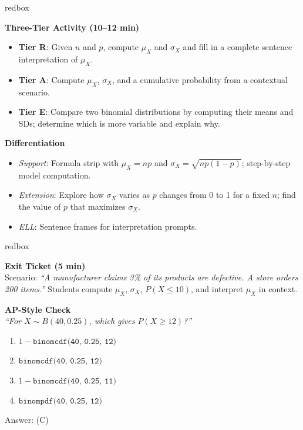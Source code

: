 \documentclass[10pt]{article}
\begin{document}
\begin{skillbox}{redbox}
\begin{minipage}[t]{0.48\linewidth}
    \textbf{Three-Tier Activity (10--12 min)}
    \begin{itemize}
        \item \textbf{Tier R}: Given $n$ and $p$, compute $\mu_X$ and $\sigma_X$
              and fill in a complete sentence interpretation of $\mu_X$.
        \item \textbf{Tier A}: Compute $\mu_X$, $\sigma_X$, and a cumulative
              probability from a contextual scenario.
        \item \textbf{Tier E}: Compare two binomial distributions by computing
              their means and SDs; determine which is more variable and explain why.
    \end{itemize}
\end{minipage}
\hfill
\begin{minipage}[t]{0.48\linewidth}
    \textbf{Differentiation}
    \begin{itemize}
        \item \textit{Support}: Formula strip with $\mu_X = np$ and
              $\sigma_X = \sqrt{np(1-p)}$; step-by-step model computation.
        \item \textit{Extension}: Explore how $\sigma_X$ varies as $p$ changes
              from 0 to 1 for a fixed $n$; find the value of $p$ that maximizes
              $\sigma_X$.
        \item \textit{ELL}: Sentence frames for interpretation prompts.
    \end{itemize}
\end{minipage}
\end{skillbox}

\begin{skillbox}{redbox}
\begin{minipage}[t]{0.48\linewidth}
    \textbf{Exit Ticket (5 min)}\\
    Scenario: \textit{``A manufacturer claims 3\% of its products are defective.
    A store orders 200 items.''} Students compute $\mu_X$, $\sigma_X$,
    $P(X \le 10)$, and interpret $\mu_X$ in context.
\end{minipage}
\hfill
\begin{minipage}[t]{0.48\linewidth}
    \textbf{AP-Style Check}\\
    \textit{``For $X \sim B(40, 0.25)$, which gives $P(X \ge 12)$?''}
    \begin{enumerate}[label=(\Alph*)]
        \item $1 - \texttt{binomcdf(40, 0.25, 12)}$
        \item $\texttt{binomcdf(40, 0.25, 12)}$
        \item $1 - \texttt{binomcdf(40, 0.25, 11)}$
        \item $\texttt{binompdf(40, 0.25, 12)}$
    \end{enumerate}
    Answer: (C)
\end{minipage}
\end{skillbox}
\end{document}
